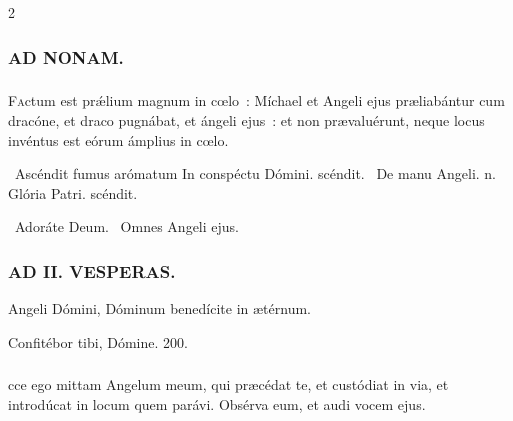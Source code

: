 \documentclass[9pt,twoside]{extarticle}
\begin{document}
\begin{multicols}{2}
{\subsubsection*{\center \textsc{AD NONAM.}}
\subsubsection*{}
\lettrine{F}actum est prǽlium magnum in cœlo~: Míchael et Angeli ejus præliabántur cum dracóne, et draco pugnábat, et ángeli ejus~: et non prævaluérunt, neque locus invéntus est eórum ámplius in cœlo.

\begin{tightlist}{}
\item {}~Ascéndit fumus arómatum \textred{*} In conspéctu Dómini. scéndit. ~De manu Angeli. n. Glória Patri. scéndit.
\item {}~Adoráte Deum. ~Omnes Angeli ejus.
\end{tightlist}

\subsubsection*{\center \textsc{AD II. VESPERAS.}}
\begin{tightlist}{}
\item {} Angeli Dómini, Dóminum benedícite in ætérnum. 
\item {} Confitébor tibi, Dómine. 200.
\end{tightlist}

\subsubsection*{}
cce ego mittam Angelum meum, qui præcédat te, et custódiat in via, et introdúcat in locum quem parávi. Obsérva eum, et audi vocem ejus.

}
\end{multicols}
\end{document}
